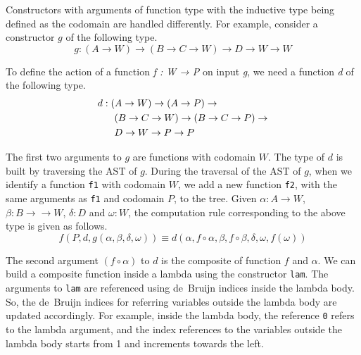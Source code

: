\documentclass[sigplan,10pt]{acmart}
\begin{document}
Constructors with arguments of function type with the inductive type being defined as the codomain are handled differently. For example, consider a constructor $g$ of the following type.
\begin{equation}
g : (A \rightarrow W) \rightarrow (B \rightarrow C \rightarrow W) \rightarrow D \rightarrow W \rightarrow W \nonumber
\end{equation}

To define the action of a function \emph{f : W → P} on input \emph{g}, we need a function \emph{d} of the following type.
\begin{align}
& d : (A \rightarrow W) \rightarrow (A \rightarrow P) \rightarrow \nonumber \\
& \hspace {0.6cm} (B \rightarrow C \rightarrow W) \rightarrow (B \rightarrow C \rightarrow P) \rightarrow \nonumber \\ 
& \hspace {0.6cm} D \rightarrow W \rightarrow P \rightarrow P \nonumber
\end{align}

The first two arguments to $g$ are functions with codomain $W$. The type of $d$ is built by traversing the AST of $g$. During the traversal of the AST of $g$, when we identify a function {\tt f1} with codomain $W$, we add a new function {\tt f2}, with the same arguments as {\tt f1} and codomain $P$, to the tree. Given $\alpha : A \rightarrow W$, $\beta : B \rightarrow \rightarrow W$, $\delta : D$ and $\omega : W$, the computation rule corresponding to the above type is given as follows.
\begin{equation}
f (P, d, g (\alpha, \beta, \delta, \omega)) \equiv d (\alpha, f \circ \alpha, \beta, f \circ \beta, \delta, \omega, f (\omega)) \nonumber
\end{equation}

The second argument $(f \circ \alpha)$ to $d$ is the composite of function $f$ and $\alpha$. We can build a composite function inside a lambda using the constructor {\tt lam}. The arguments to {\tt lam} are referenced using de~Bruijn indices inside the lambda body. So, the de~Bruijn indices for referring variables outside the lambda body are updated accordingly. For example, inside the lambda body, the reference {\tt 0} refers to the lambda argument, and the index references to the variables outside the lambda body starts from 1 and increments towards the left.
\end{document}
